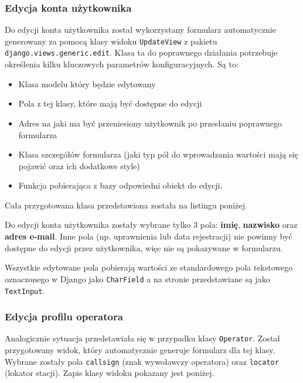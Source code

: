 \documentclass[]{mgr}
\begin{document}
                \subsubsection{Edycja konta użytkownika}
                Do edycji konta użytkownika został wykorzystany formularz automatycznie generowany za pomocą klasy widoku \texttt{UpdateView} z pakietu \texttt{django.views.generic.edit}. Klasa ta do poprawnego działania potrzebuje określenia kilku kluczowych parametrów konfiguracyjnych. Są to:
                \begin{itemize}
                    \item Klasa modelu który będzie edytowany
                    \item Pola z tej klasy, które mają być dostępne do edycji
                    \item Adres na jaki ma być przeniesiony użytkownik po przesłaniu poprawnego formularza
                    \item Klasa szczegółów formularza (jaki typ pól do wprowadzania wartości mają się pojawić oraz ich dodatkowe style)
                    \item Funkcja pobierająca z bazy odpowiedni obiekt do edycji.
                \end{itemize}
                Cała przygotowana klasa przedstawiona została na listingu poniżej.
                
                Do edycji konta użytkownika zostały wybrane tylko 3 pola: \textbf{imię}, \textbf{nazwisko} oraz \textbf{adres e-mail}. Inne pola (np. uprawnienia lub data rejestracji) nie powinny być dostępne do edycji przez użytkownika, więc nie są pokazywane w formularzu.

                Wszystkie edytowane pola pobierają wartości ze standardowego pola tekstowego oznaczonego w Django jako \texttt{CharField} a na stronie przedstawiane są jako \texttt{TextInput}.

                \subsubsection{Edycja profilu operatora}
                Analogicznie sytuacja przedstawiała się w przypadku klasy \texttt{Operator}. Został przygotowany widok, który automatycznie generuje formularz dla tej klasy. Wybrane zostały pola \texttt{callsign} (znak wywoławczy operatora) oraz \texttt{locator} (lokator stacji). Zapis klasy widoku pokazany jest poniżej.
                
\end{document}
